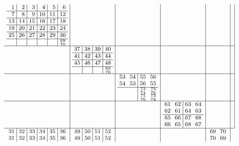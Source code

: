 \documentclass[12pt,a4paper]{amsart}
\begin{document}
\begin{align*}\footnotesize\arraycolsep3pt
  \begin{array}{c|c|c|c|c|c|c}
\begin{array}{r|r|r|r|r|r}%
1&2&3&4&5&6\\\hline%
7&8&9&10&11&12\\\hline%
13&14&15&16&17&18\\\hline%
19&20&21&22&23&24\\\hline%
25&26&27&28&29&30\\\hline%
  &  &  &  &  &^{69}_{70}\\%
\end{array}%
&&&&& \\\hline
&
\begin{array}{r|r|r|r}%
37&38&39&40\\\hline%
41&42&43&44\\\hline%
45&46&47&48\\\hline%
  &  &  &^{69}_{70}\\%
\end{array}%
&&&& \\\hline
&&
\begin{array}{rr|rr}%
53&54&55&56\\%
54&53&56&55\\\hline%
  &  &^{73}_{74}&^{75}_{76}\\%
  &  &^{75}_{76}&^{73}_{74}\\%
\end{array}%
&&& \\\hline
&&&
\begin{array}{rr|rr}%
61&62&63&64\\%
62&61&64&63\\\hline%
65&66&67&68\\%
66&65&68&67\\%
\end{array}%
&& \\\hline
\begin{array}{r|r|r|r|r|r}%
31&32&33&34&35&36\\%
31&32&33&34&35&36\\%
\end{array}%
&
\begin{array}{r|r|r|r}%
49&50&51&52\\%
49&50&51&52\\%
\end{array}%
&&&
\begin{array}{rr}%
69&70\\%
70&69\\%

\end{array}
\end{array}
\end{align*}
\end{document}
